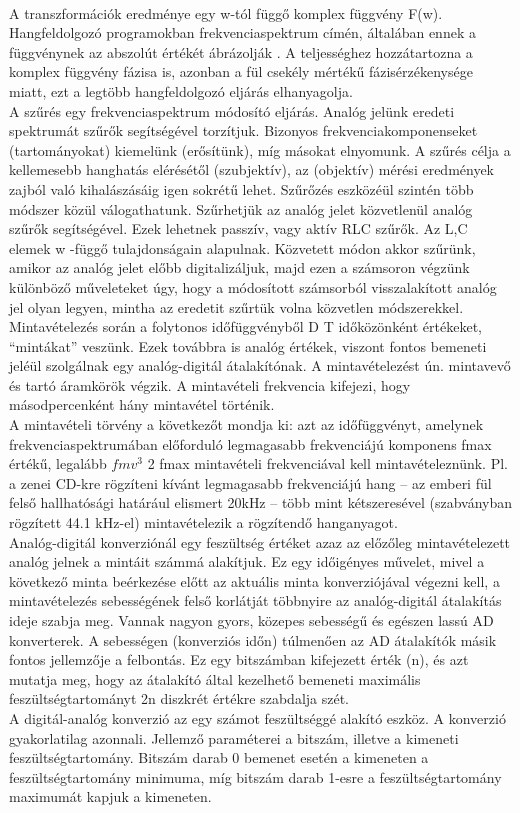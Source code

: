 \documentclass[a4paper,12pt]{paper}
\begin{document}
\\A transzformációk eredménye egy w-tól függő komplex függvény F(w). Hangfeldolgozó programokban frekvenciaspektrum címén, általában ennek a függvénynek az abszolút értékét ábrázolják . A teljességhez hozzátartozna a komplex függvény fázisa is, azonban a fül csekély mértékű fázisérzékenysége miatt, ezt a legtöbb hangfeldolgozó eljárás elhanyagolja.
\\A szűrés egy frekvenciaspektrum módosító eljárás. Analóg jelünk eredeti spektrumát szűrők segítségével torzítjuk. Bizonyos frekvenciakomponenseket (tartományokat) kiemelünk (erősítünk), míg másokat elnyomunk. A szűrés célja a kellemesebb hanghatás elérésétől (szubjektív), az (objektív) mérési eredmények zajból való kihalászásáig igen sokrétű lehet. Szűrőzés eszközéül szintén több módszer közül válogathatunk. Szűrhetjük az analóg jelet közvetlenül analóg szűrők segítségével. Ezek lehetnek passzív, vagy aktív RLC szűrők. Az L,C elemek w -függő tulajdonságain alapulnak. Közvetett módon akkor szűrünk, amikor az analóg jelet előbb digitalizáljuk, majd ezen a számsoron végzünk különböző műveleteket úgy, hogy a módosított számsorból visszalakított analóg jel olyan legyen, mintha az eredetit szűrtük volna közvetlen módszerekkel.
\\Mintavételezés során a folytonos időfüggvényből D T időközönként értékeket, “mintákat” veszünk. Ezek továbbra is analóg értékek, viszont fontos bemeneti jeléül szolgálnak egy analóg-digitál átalakítónak. A mintavételezést ún. mintavevő és tartó áramkörök végzik. A mintavételi frekvencia kifejezi, hogy másodpercenként hány mintavétel történik.
\\A mintavételi törvény a következőt mondja ki: azt az időfüggvényt, amelynek frekvenciaspektrumában előforduló legmagasabb frekvenciájú komponens fmax értékű, legalább $fmv^{3}$ 2 fmax mintavételi frekvenciával kell mintavételeznünk. Pl. a zenei CD-kre rögzíteni kívánt legmagasabb frekvenciájú hang – az emberi fül felső hallhatósági határául elismert 20kHz – több mint kétszeresével (szabványban rögzített 44.1 kHz-el) mintavételezik a rögzítendő hanganyagot.
\\Analóg-digitál konverziónál egy feszültség értéket azaz az előzőleg mintavételezett analóg jelnek a mintáit számmá alakítjuk. Ez egy időigényes művelet, mivel a következő minta beérkezése előtt az aktuális minta konverziójával végezni kell, a mintavételezés sebességének felső korlátját többnyire az analóg-digitál átalakítás ideje szabja meg. Vannak nagyon gyors, közepes sebességű és egészen lassú AD konverterek. A sebességen (konverziós időn) túlmenően az AD átalakítók másik fontos jellemzője a felbontás. Ez egy bitszámban kifejezett érték (n), és azt mutatja meg, hogy az átalakító által kezelhető bemeneti maximális feszültségtartományt 2n diszkrét értékre szabdalja szét.
\\A digitál-analóg konverzió az egy számot feszültséggé alakító eszköz. A konverzió gyakorlatilag azonnali. Jellemző paraméterei a bitszám, illetve a kimeneti feszültségtartomány. Bitszám darab 0 bemenet esetén a kimeneten a feszültségtartomány minimuma, míg bitszám darab 1-esre a feszültségtartomány maximumát kapjuk a kimeneten.
\end{document}
